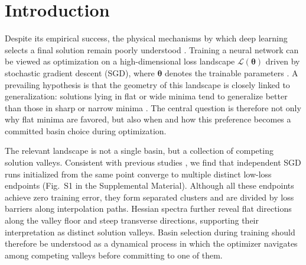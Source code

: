 \documentclass[aps,prx,reprint,superscriptaddress,longbibliography,nofootinbib,floatfix]{revtex4-2}
\begin{document}
\section{Introduction}
Despite its empirical success, the physical mechanisms by which deep learning selects a final solution remain poorly understood \cite{lecunDeepLearning2015,levineMachineLearningMeets2024a}. Training a neural network can be viewed as optimization on a high-dimensional loss landscape $\mathcal{L}(\bm{\theta})$ driven by stochastic gradient descent (SGD), where $\bm{\theta}$ denotes the trainable parameters \cite{liuLossLandscapesOptimization2022,sunGlobalLandscapeNeural2020}. A prevailing hypothesis is that the geometry of this landscape is closely linked to generalization: solutions lying in flat or wide minima tend to generalize better than those in sharp or narrow minima \cite{hochreiterFlatMinima1997,liVisualizingLossLandscape2018,jastrzebskiThreeFactorsInfluencing2018,wuHowSGDSelects2018,keskarLargeBatchTrainingDeep2017,chenSimpleConnectionLoss2024}. The central question is therefore not only why flat minima are favored, but also when and how this preference becomes a committed basin choice during optimization.

The relevant landscape is not a single basin, but a collection of competing solution valleys. Consistent with previous studies \cite{choromanskaLossSurfacesMultilayer2015,liVisualizingLossLandscape2018,fortLargeScaleStructure2019,garipovLossSurfacesMode2018,wuHowSGDSelects2018,ghorbaniInvestigationNeuralNet2019,chaudhariEntropySGDBiasingGradient2019}, we find that independent SGD runs initialized from the same point converge to multiple distinct low-loss endpoints (Fig.~S1 in the Supplemental Material). Although all these endpoints achieve zero training error, they form separated clusters and are divided by loss barriers along interpolation paths. Hessian spectra further reveal flat directions along the valley floor and steep transverse directions, supporting their interpretation as distinct solution valleys. Basin selection during training should therefore be understood as a dynamical process in which the optimizer navigates among competing valleys before committing to one of them.
\end{document}
